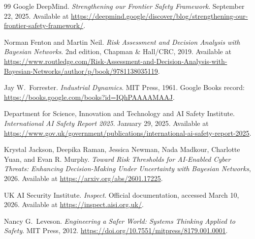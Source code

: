 \documentclass[11pt]{article}
\begin{document}
\begin{thebibliography}{99}
Google DeepMind.
\textit{Strengthening our Frontier Safety Framework}.
September 22, 2025.
Available at \url{https://deepmind.google/discover/blog/strengthening-our-frontier-safety-framework/}.

Norman Fenton and Martin Neil.
\textit{Risk Assessment and Decision Analysis with Bayesian Networks}.
2nd edition, Chapman \& Hall/CRC, 2019.
Available at \url{https://www.routledge.com/Risk-Assessment-and-Decision-Analysis-with-Bayesian-Networks/author/p/book/9781138035119}.

Jay W.~Forrester.
\textit{Industrial Dynamics}.
MIT Press, 1961.
Google Books record: \url{https://books.google.com/books?id=IQhPAAAAMAAJ}.

Department for Science, Innovation and Technology and AI Safety Institute.
\textit{International AI Safety Report 2025}.
January 29, 2025.
Available at \url{https://www.gov.uk/government/publications/international-ai-safety-report-2025}.

Krystal Jackson, Deepika Raman, Jessica Newman, Nada Madkour, Charlotte Yuan, and Evan R. Murphy.
\textit{Toward Risk Thresholds for AI-Enabled Cyber Threats: Enhancing Decision-Making Under Uncertainty with Bayesian Networks}, 2026.
Available at \url{https://arxiv.org/abs/2601.17225}.


UK AI Security Institute.
\textit{Inspect}.
Official documentation, accessed March 10, 2026.
Available at \url{https://inspect.aisi.org.uk/}.

Nancy G.~Leveson.
\textit{Engineering a Safer World: Systems Thinking Applied to Safety}.
MIT Press, 2012.
\url{https://doi.org/10.7551/mitpress/8179.001.0001}.


\end{thebibliography}
\end{document}
